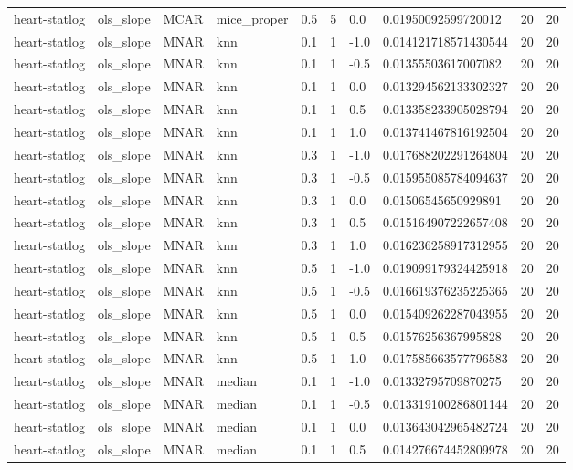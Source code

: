 \begin{tabular}{llllllllll}
heart-statlog & ols\_slope & MCAR & mice\_proper & 0.5 & 5 & 0.0 & 0.01950092599720012 & 20 & 20 \\
heart-statlog & ols\_slope & MNAR & knn & 0.1 & 1 & -1.0 & 0.014121718571430544 & 20 & 20 \\
heart-statlog & ols\_slope & MNAR & knn & 0.1 & 1 & -0.5 & 0.01355503617007082 & 20 & 20 \\
heart-statlog & ols\_slope & MNAR & knn & 0.1 & 1 & 0.0 & 0.013294562133302327 & 20 & 20 \\
heart-statlog & ols\_slope & MNAR & knn & 0.1 & 1 & 0.5 & 0.013358233905028794 & 20 & 20 \\
heart-statlog & ols\_slope & MNAR & knn & 0.1 & 1 & 1.0 & 0.013741467816192504 & 20 & 20 \\
heart-statlog & ols\_slope & MNAR & knn & 0.3 & 1 & -1.0 & 0.017688202291264804 & 20 & 20 \\
heart-statlog & ols\_slope & MNAR & knn & 0.3 & 1 & -0.5 & 0.015955085784094637 & 20 & 20 \\
heart-statlog & ols\_slope & MNAR & knn & 0.3 & 1 & 0.0 & 0.01506545650929891 & 20 & 20 \\
heart-statlog & ols\_slope & MNAR & knn & 0.3 & 1 & 0.5 & 0.015164907222657408 & 20 & 20 \\
heart-statlog & ols\_slope & MNAR & knn & 0.3 & 1 & 1.0 & 0.016236258917312955 & 20 & 20 \\
heart-statlog & ols\_slope & MNAR & knn & 0.5 & 1 & -1.0 & 0.019099179324425918 & 20 & 20 \\
heart-statlog & ols\_slope & MNAR & knn & 0.5 & 1 & -0.5 & 0.016619376235225365 & 20 & 20 \\
heart-statlog & ols\_slope & MNAR & knn & 0.5 & 1 & 0.0 & 0.015409262287043955 & 20 & 20 \\
heart-statlog & ols\_slope & MNAR & knn & 0.5 & 1 & 0.5 & 0.01576256367995828 & 20 & 20 \\
heart-statlog & ols\_slope & MNAR & knn & 0.5 & 1 & 1.0 & 0.017585663577796583 & 20 & 20 \\
heart-statlog & ols\_slope & MNAR & median & 0.1 & 1 & -1.0 & 0.01332795709870275 & 20 & 20 \\
heart-statlog & ols\_slope & MNAR & median & 0.1 & 1 & -0.5 & 0.013319100286801144 & 20 & 20 \\
heart-statlog & ols\_slope & MNAR & median & 0.1 & 1 & 0.0 & 0.013643042965482724 & 20 & 20 \\
heart-statlog & ols\_slope & MNAR & median & 0.1 & 1 & 0.5 & 0.014276674452809978 & 20 & 20 \\

\end{tabular}
